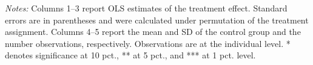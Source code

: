 \begin{table}[h]
{\begin{threeparttable}
\begin{tabular}{l*{5}{c}}
\bottomrule \end{tabular} \begin{tablenotes}[flushleft] \footnotesize \item \emph{Notes:} Columns 1--3 report OLS estimates of the treatment effect. Standard errors are in parentheses and were calculated under permutation of the treatment assignment. Columns 4--5 report the mean and SD of the control group and the number observations, respectively. Observations are at the individual level. * denotes significance at 10 pct., ** at 5 pct., and *** at 1 pct. level. \end{tablenotes} \end{threeparttable} } \end{table}

